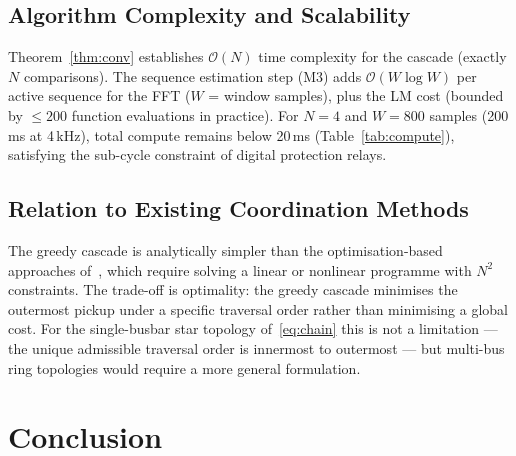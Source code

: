 \documentclass[journal,twoside,10pt]{IEEEtran}
\begin{document}
\subsection{Algorithm Complexity and Scalability}
\label{sec:disc:complexity}

Theorem~\ref{thm:conv} establishes $\mathcal{O}(N)$ time complexity for
the cascade (exactly $N$ comparisons).
The sequence estimation step (M3) adds $\mathcal{O}(W\log W)$ per active
sequence for the FFT ($W$ = window samples), plus the LM cost (bounded
by $\leq\!200$ function evaluations in practice).
For $N=4$ and $W = 800$ samples (200\,ms at 4\,kHz), total compute
remains below 20\,ms (Table~\ref{tab:compute}), satisfying the
sub-cycle constraint of digital protection relays.

\subsection{Relation to Existing Coordination Methods}
\label{sec:disc:related}

The greedy cascade is analytically simpler than the optimisation-based
approaches of~\cite{Saleh2017,Najy2013,Chen2016}, which require solving
a linear or nonlinear programme with $N^2$ constraints.
The trade-off is optimality: the greedy cascade minimises the outermost
pickup under a specific traversal order rather than minimising a global
cost.
For the single-busbar star topology of~\eqref{eq:chain} this is not a
limitation — the unique admissible traversal order is innermost to
outermost — but multi-bus ring topologies would require a more general
formulation.

\section{Conclusion}
\label{sec:conc}
\end{document}
